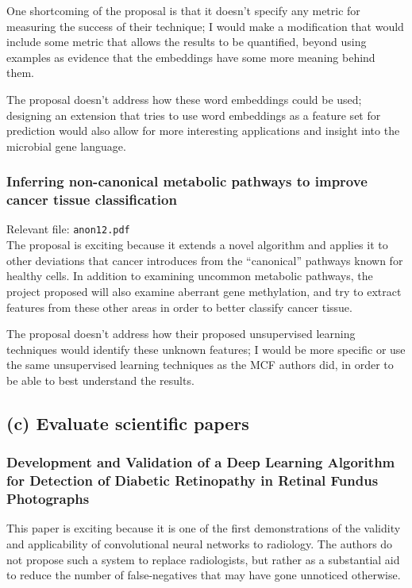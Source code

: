 \documentclass[11pt]{article}
\begin{document}
One shortcoming of the proposal is that it doesn't specify any metric for
measuring the success of their technique; I would make a modification that
would include some metric that allows the results to be quantified, beyond
using examples as evidence that the embeddings have some more meaning
behind them.

The proposal doesn't address how these word embeddings could be used;
designing an extension that tries to use word embeddings as a feature set
for prediction would also allow for more interesting applications and
insight into the microbial gene language.

\subsubsection*{Inferring non-canonical metabolic pathways to improve cancer tissue classification}
Relevant file: {\tt anon12.pdf}\\
The proposal is exciting because it extends a novel algorithm and applies it
to other deviations that cancer introduces from the ``canonical'' pathways
known for healthy cells. In addition to examining uncommon metabolic pathways,
the project proposed will also examine aberrant gene methylation, and try
to extract features from these other areas in order to better classify 
cancer tissue.

The proposal doesn't address how their proposed unsupervised learning
techniques would identify these unknown features; I would be more
specific or use the same unsupervised learning techniques as the MCF authors
did, in order to be able to best understand the results.

\subsection*{(c) Evaluate scientific papers}

\subsubsection*{Development and Validation of a Deep Learning Algorithm for
Detection of Diabetic Retinopathy in Retinal Fundus Photographs}
This paper is exciting because it is one of the first demonstrations of the
validity and applicability of convolutional neural networks to radiology.
The authors do not propose such a system to replace radiologists, but rather
as a substantial aid to reduce the number of false-negatives that may have
gone unnoticed otherwise.
\end{document}
